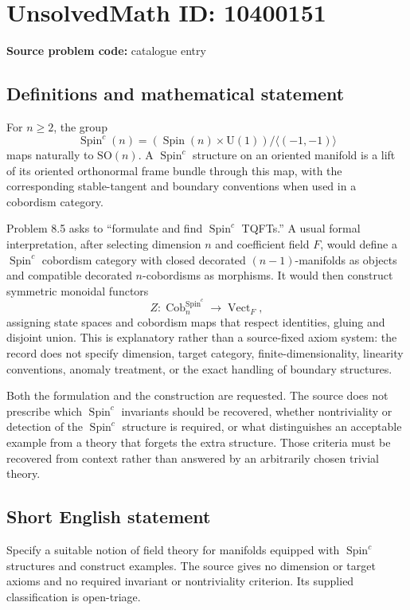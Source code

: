 \documentclass[11pt]{article}
\begin{document}
\section*{UnsolvedMath ID: 10400151}
\textbf{Source problem code:} catalogue entry
\subsection{Definitions and mathematical statement}
For \(n\ge2\), the group
\[
 \operatorname{Spin}^c(n)=
 (\operatorname{Spin}(n)\times\mathrm U(1))/\langle(-1,-1)\rangle
\]
maps naturally to \(\mathrm{SO}(n)\). A \(\operatorname{Spin}^c\) structure on an oriented manifold is a lift of its oriented orthonormal frame bundle through this map, with the corresponding stable-tangent and boundary conventions when used in a cobordism category.

Problem 8.5 asks to ``formulate and find \(\operatorname{Spin}^c\) TQFTs.'' A usual formal interpretation, after selecting dimension \(n\) and coefficient field \(F\), would define a \(\operatorname{Spin}^c\) cobordism category with closed decorated \((n-1)\)-manifolds as objects and compatible decorated \(n\)-cobordisms as morphisms. It would then construct symmetric monoidal functors
\[
 Z:\operatorname{Cob}^{\operatorname{Spin}^c}_n
       \longrightarrow\operatorname{Vect}_F,
\]
assigning state spaces and cobordism maps that respect identities, gluing and disjoint union. This is explanatory rather than a source-fixed axiom system: the record does not specify dimension, target category, finite-dimensionality, linearity conventions, anomaly treatment, or the exact handling of boundary structures.

Both the formulation and the construction are requested. The source does not prescribe which \(\operatorname{Spin}^c\) invariants should be recovered, whether nontriviality or detection of the \(\operatorname{Spin}^c\) structure is required, or what distinguishes an acceptable example from a theory that forgets the extra structure. Those criteria must be recovered from context rather than answered by an arbitrarily chosen trivial theory.
\subsection{Short English statement}
Specify a suitable notion of field theory for manifolds equipped with \(\operatorname{Spin}^c\) structures and construct examples. The source gives no dimension or target axioms and no required invariant or nontriviality criterion. Its supplied classification is open-triage.
\end{document}
